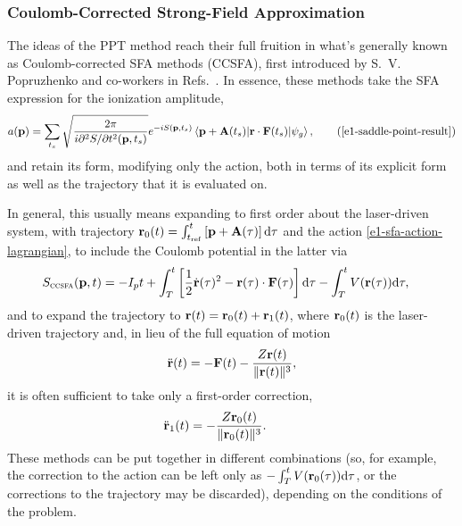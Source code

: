 \subsubsection{Coulomb-Corrected Strong-Field Approximation}
The ideas of the PPT method reach their full fruition in what's generally known as Coulomb-corrected SFA methods (CCSFA), first introduced by S.~V. Popruzhenko and co-workers in Refs.~\citealp{CCSFA_initial_short, CCSFA_initial_full, popruzhenko_ccsfa-arbitrary-frequency_2008, popruzhenko_multiphoton_2009}. In essence, these methods take the SFA expression for the ionization amplitude, 
\begin{equation}
a(\vbp)
=
\sum_{\ts}
\sqrt{\frac{2\pi}{i\partial^2 S/\partial t^2(\vbp,\ts)}}
e^{-iS(\vbp,\ts)} 
\matrixel{\vbp+\vba(\ts)}{\vbr\cdot\vbf(\ts)}{\psi_g}
,
\backtag{e1-saddle-point-result}
\end{equation}
and retain its form, modifying only the action, both in terms of its explicit form as well as the trajectory that it is evaluated on. 

In general, this usually means expanding to first order about the laser-driven system, with trajectory $\vb{r}_0(t)=\int_{t_\mathrm{ref}}^{t}\left[ \vb{p}+\vb{A}(\tau)\right] \mathrm{d}\tau$  and the action \eqref{e1-sfa-action-lagrangian}, to include the Coulomb potential in the latter via
\begin{align}
S_{\textsc{ccsfa}}(\vb{p},t) 
&=
-I_p t + \int_{T}^{t} \left[\frac 12 \dot{\vb{r}}(\tau)^2 - \vb{r}(\tau)\cdot \vb{F}(\tau) \right] \mathrm{d}\tau
-\int_{T}^t V(\vb{r}(\tau))\mathrm{d}\tau
,
\label{e1-ccsfa-action-lagrangian-coulomb}
\end{align}
and to expand the trajectory to $\vb{r}(t) = \vb{r}_0(t) + \vb{r}_1(t)$, where $\vb{r}_0(t)$ is the laser-driven trajectory and, in lieu of the full equation of motion
\begin{equation}
\ddot {\vb{r}}(t) = -\vb{F}(t) -\frac{Z\vb{r}(t)}{\|\vb{r}(t)\|^3},
\label{e1-ccsfa-equation-of-motion-full}
\end{equation}
it is often sufficient to take only a first-order correction,
\begin{equation}
\ddot \vbr_1(t) = -\frac{Z\vbr_0(t)}{\|\vbr_0(t)\|^3}.  \phantom{-\vbf(t)}
\label{e1-ccsfa-equation-of-motion-first-order}
\end{equation}
These methods can be put together in different combinations (so, for example, the correction to the action can be left only as $-\int_{T}^t V(\vb{r}_0(\tau))\mathrm{d}\tau$, or the corrections to the trajectory may be discarded), depending on the conditions of the problem.

